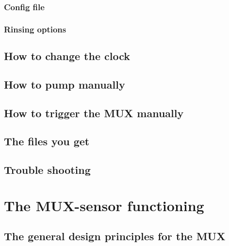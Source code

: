 \documentclass[]{book}
\begin{document}
\hypertarget{config-file}{%
\subsection{Config file}\label{config-file}}

\hypertarget{rinsing-options}{%
\subsection{Rinsing options}\label{rinsing-options}}

\hypertarget{how-to-change-the-clock}{%
\section{How to change the clock}\label{how-to-change-the-clock}}

\hypertarget{how-to-pump-manually}{%
\section{How to pump manually}\label{how-to-pump-manually}}

\hypertarget{how-to-trigger-the-mux-manually}{%
\section{How to trigger the MUX manually}\label{how-to-trigger-the-mux-manually}}

\hypertarget{the-files-you-get}{%
\section{The files you get}\label{the-files-you-get}}

\hypertarget{trouble-shooting}{%
\section{Trouble shooting}\label{trouble-shooting}}

\hypertarget{the-mux-sensor-functioning}{%
\chapter{The MUX-sensor functioning}\label{the-mux-sensor-functioning}}

\hypertarget{the-general-design-principles-for-the-mux}{%
\section{The general design principles for the MUX}\label{the-general-design-principles-for-the-mux}}
\end{document}
